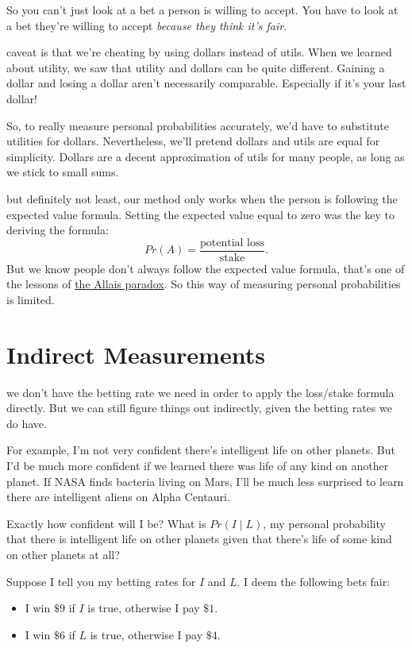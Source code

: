 \documentclass[justified]{tufte-book}
\providecommand{\tightlist}{%
  \setlength{\itemsep}{0pt}\setlength{\parskip}{0pt}}
\newcommand{\given}{\mid}
\newcommand{\p}{Pr}
\theoremstyle{definition}
\theoremstyle{definition}
\theoremstyle{definition}
\theoremstyle{remark}
\begin{document}
So you can't just look at a bet a person is willing to accept. You have to look at a bet they're willing to accept \emph{because they think it's fair}.

 caveat is that we're cheating by using dollars instead of utils. When we learned about utility, we saw that utility and dollars can be quite different. Gaining a dollar and losing a dollar aren't necessarily comparable. Especially if it's your last dollar!

So, to really measure personal probabilities accurately, we'd have to substitute utilities for dollars. Nevertheless, we'll pretend dollars and utils are equal for simplicity. Dollars are a decent approximation of utils for many people, as long as we stick to small sums.

 but definitely not least, our method only works when the person is following the expected value formula. Setting the expected value equal to zero was the key to deriving the formula:
\[ \p(A) = \frac{\mbox{potential loss}}{\mbox{stake}}. \]
But we know people don't always follow the expected value formula, that's one of the lessons of \protect\hyperlink{the-allais-paradox}{the Allais paradox}. So this way of measuring personal probabilities is limited.

\hypertarget{indirect-measurements}{%
\section{Indirect Measurements}\label{indirect-measurements}}

 we don't have the betting rate we need in order to apply the loss/stake formula directly. But we can still figure things out indirectly, given the betting rates we do have.

For example, I'm not very confident there's intelligent life on other planets. But I'd be much more confident if we learned there was life of any kind on another planet. If NASA finds bacteria living on Mars, I'll be much less surprised to learn there are intelligent aliens on Alpha Centauri.

Exactly how confident will I be? What is \(\p(I \given L)\), my personal probability that there is intelligent life on other planets given that there's life of some kind on other planets at all?

Suppose I tell you my betting rates for \(I\) and \(L\). I deem the following bets fair:

\begin{itemize}
\tightlist
\item
  I win \(\$9\) if \(I\) is true, otherwise I pay \(\$1\).
\item
  I win \(\$6\) if \(L\) is true, otherwise I pay \(\$4\).
\end{itemize}
\end{document}

